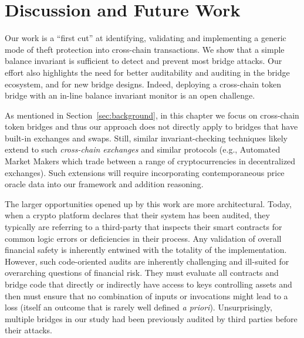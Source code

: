 \section{Discussion and Future Work}

\label{sec:discuss}
Our work is a ``first cut'' at identifying, validating and implementing a
generic mode of theft protection into cross-chain transactions. We show that a
simple balance invariant is sufficient to detect and prevent most bridge
attacks. Our effort also highlights the need for better auditability and
auditing in the bridge ecosystem, and for new bridge designs.  Indeed, deploying a cross-chain token bridge with an in-line balance invariant
monitor is an open challenge.

As mentioned in Section~\ref{sec:background}, in this chapter we focus on
cross-chain token bridges and thus our approach does not directly apply to
bridges that have built-in exchanges and swaps.  Still, similar
invariant-checking techniques likely extend to such \emph{cross-chain exchanges}
and similar protocols (e.g., Automated Market Makers which trade between a
range of cryptocurrencies in decentralized exchanges). Such extensions will
require incorporating contemporaneous price oracle data
into our framework
and addition reasoning.

The larger opportunities opened up by this work are
more architectural.  Today, when a crypto platform declares that their
system has been audited, they typically are referring to a third-party
that inspects their smart contracts for common logic errors or
deficiencies in their process.  Any validation of overall financial
safety is inherently entwined with the totality of the implementation.
However, such code-oriented audits are inherently challenging and
ill-suited for overarching questions of financial risk.  They must
evaluate all contracts and bridge code that directly or indirectly
have access to keys controlling assets and then must ensure that no
combination of inputs or invocations might lead to a loss (itself an
outcome that is rarely well defined \emph{a priori}).  Unsurprisingly,
multiple bridges in our study had been previously audited by third
parties before their attacks.

